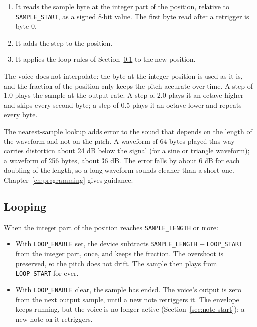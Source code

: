 \begin{enumerate}
	\item It reads the sample byte at the integer part of the position, relative to \texttt{SAMPLE\_START}, as a signed 8-bit
	      value. The first byte read after a retrigger is byte 0.
	\item It adds the step to the position.
	\item It applies the loop rules of Section~\ref{sec:looping} to the new position.
\end{enumerate}

The voice does not interpolate: the byte at the integer position is used as it is, and the fraction of the position
only keeps the pitch accurate over time. A step of 1.0 plays the sample at the output rate. A step of 2.0 plays it an
octave higher and skips every second byte; a step of 0.5 plays it an octave lower and repeats every byte.

The nearest-sample lookup adds error to the sound that depends on the length of the waveform and not on the pitch. A
waveform of 64 bytes played this way carries distortion about 24 dB below the signal (for a sine or triangle waveform);
a waveform of 256 bytes, about 36 dB. The error falls by about 6 dB for each doubling of the length, so a long waveform
sounds cleaner than a short one. Chapter~\ref{ch:programming} gives guidance.

\subsection{Looping}
\label{sec:looping}

When the integer part of the position reaches \texttt{SAMPLE\_LENGTH} or more:

\begin{itemize}
	\item With \texttt{LOOP\_ENABLE} set, the device subtracts \texttt{SAMPLE\_LENGTH} $-$ \texttt{LOOP\_START} from the integer
	      part, once, and keeps the fraction. The overshoot is preserved, so the pitch does not drift. The sample then plays from
	      \texttt{LOOP\_START} for ever.
	\item With \texttt{LOOP\_ENABLE} clear, the sample has ended. The voice's output is zero from the next output sample, until a
	      new note retriggers it. The envelope keeps running, but the voice is no longer active (Section~\ref{sec:note-start}): a
	      new note on it retriggers.
\end{itemize}

